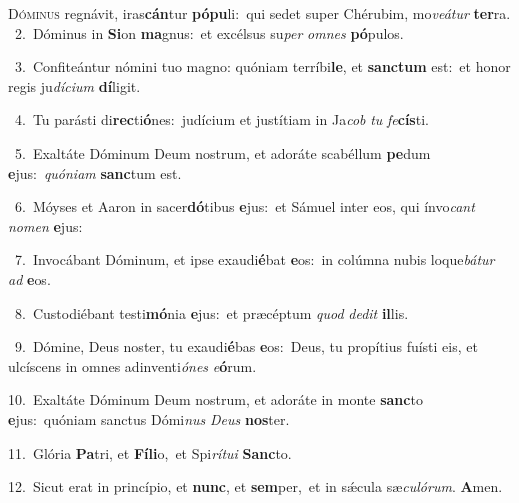 \lettrine{\initial\textcolor{\initialcolor}{D}}{óminus} regnávit, iras\-\textbf{cán}\-tur \textbf{pó}\-\textbf{pu}li:~\star qui sedet super Chérubim, mo\-\textit{ve}\-\textit{á}\textit{tur} \textbf{ter}\-ra.\\
{\numbfont\textcolor{\numbcolor}{~2.}}~Dóminus in \textbf{Si}\-on \textbf{ma}\-gnus:~\star et excélsus su\textit{per} \textit{om}\-\textit{nes} \textbf{pó}\-pulos.\par
{\numbfont\textcolor{\numbcolor}{~3.}}~Confiteántur nómini tuo magno: quóniam terríbi\-\textbf{le}\-, et \textbf{sanc}\-\textbf{tum} est:~\star et honor regis ju\-\textit{dí}\-\textit{ci}\textit{um} \textbf{dí}\-ligit.\par
{\numbfont\textcolor{\numbcolor}{~4.}}~Tu parásti di\-\textbf{rec}\-ti\-\textbf{ó}\-nes:~\star judícium et justítiam in Ja\textit{cob} \textit{tu} \textit{fe}\-\textbf{cís}ti.\par
{\numbfont\textcolor{\numbcolor}{~5.}}~Exaltáte Dóminum Deum nostrum, et adoráte scabéllum \textbf{pe}\-dum \textbf{e}\-jus:~\star \textit{quón}\-\textit{i}\textit{am} \textbf{sanc}\-tum est.\par
{\numbfont\textcolor{\numbcolor}{~6.}}~Móyses et Aaron in sacer\-\textbf{dó}\-tibus \textbf{e}\-jus:~\star et Sámuel inter eos, qui ínvo\textit{cant} \textit{no}\-\textit{men} \textbf{e}\-jus:\par
{\numbfont\textcolor{\numbcolor}{~7.}}~Invocábant Dóminum, et ipse exaudi\-\textbf{é}\-bat \textbf{e}\-os:~\star in colúmna nubis loque\-\textit{bá}\-\textit{tur} \textit{ad} \textbf{e}\-os.\par
{\numbfont\textcolor{\numbcolor}{~8.}}~Custodiébant testi\-\textbf{mó}\-nia \textbf{e}\-jus:~\star et præcéptum \textit{quod} \textit{de}\-\textit{dit} \textbf{il}\-lis.\par
{\numbfont\textcolor{\numbcolor}{~9.}}~Dómine, Deus noster, tu exaudi\-\textbf{é}\-bas \textbf{e}\-os:~\star Deus, tu propítius fuísti eis, et ulcíscens in omnes adinventi\-\textit{ó}\-\textit{nes} \textit{e}\-\textbf{ó}rum.\par
{\numbfont\textcolor{\numbcolor}{10.}}~Exaltáte Dóminum Deum nostrum, et adoráte in monte \textbf{sanc}\-to \textbf{e}\-jus:~\star quóniam sanctus Dómi\textit{nus} \textit{De}\-\textit{us} \textbf{nos}\-ter.\par
{\numbfont\textcolor{\numbcolor}{11.}}~Glória \textbf{Pa}\-tri, et \textbf{Fí}\-\textbf{li}o,~\star et Spi\-\textit{rí}\-\textit{tu}\textit{i} \textbf{Sanc}\-to.\par
{\numbfont\textcolor{\numbcolor}{12.}}~Sicut erat in princípio, et \textbf{nunc}\-, et \textbf{sem}\-per,~\star et in sǽcula sæ\-\textit{cu}\-\textit{ló}\textit{rum}. \textbf{A}\-men.\par
